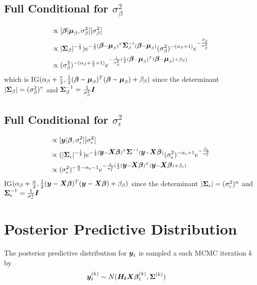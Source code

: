 \documentclass[fleqn]{article}
\def\bm#1{\mbox{\boldmath $#1$}}
\begin{document}
\subsection{Full Conditional for $\sigma^2_\beta$}
%
\begin{align*}
[\sigma^2_\beta | \cdot] & \propto [\bm{\beta} | \bm{\mu}_\beta, \sigma^2_\beta] [\sigma^2_\beta]\\
%
& \propto |\bm{\Sigma}_\beta|^{ - \frac{1} {2}}) e^{ - \frac{1} {2} (\bm{\beta} - \bm{\mu}_\beta)^T \bm{\Sigma}_\beta^{ - 1} (\bm{\beta} - \bm{\mu}_\beta)} (\sigma^2_\beta)^{ - (\alpha_\beta + 1)} e^{ - \frac{\beta_\beta} {\sigma^2_\beta}}\\
%
& \propto (\sigma^2_\beta)^{ - (\alpha_\beta + \frac{\tau} {2} + 1)} e^{ - \frac{1} {\sigma^2_\beta} (\frac{1} {2} (\bm{\beta} - \bm{\mu}_\beta)^T (\bm{\beta} - \bm{\mu}_\beta) + \beta_\beta)}
\end{align*}
%
which is IG$(\alpha_\beta + \frac{\tau} {2}, \frac{1} {2} (\bm{\beta} - \bm{\mu}_\beta)^T (\bm{\beta} - \bm{\mu}_\beta) + \beta_\beta)$ since the determinant $|\bm{\Sigma}_\beta| = (\sigma^2_\beta)^{\tau}$ and $\bm{\Sigma}_\beta^{ - 1} = \frac{1} {\sigma^2_\beta} \bm{I}$
%
\subsection{Full Conditional for $\sigma^2_\epsilon$}
%
\begin{align*}
[\sigma^2_\epsilon | \cdot] & \propto [\bm{y} | \bm{\beta}, \sigma^2_\epsilon] [\sigma^2_\epsilon]\\
%
& \propto (|\bm{\Sigma}_\epsilon |^{ - \frac{1} {2}}) e^{ - \frac{1} {2} (\bm{y} - \bm{X} \bm{\beta})^T \bm{\Sigma}^{ - 1} (\bm{y} - \bm{X} \bm{\beta})} (\sigma^2_\epsilon)^{ - \alpha_\epsilon + 1} e^{ - \frac{\beta_\epsilon} {\sigma^2_\epsilon}}\\
%
& \propto (\sigma^2_\epsilon)^{ -\frac{n} {2} - \alpha_\epsilon - 1} e^{ - \frac{1} {\sigma^2_\epsilon} ( \frac{1} {2} (\bm{y} - \bm{X} \bm{\beta})^T (\bm{y} - \bm{X} \bm{\beta}) + \beta_\epsilon)}
\end{align*}
% 
 IG$(\alpha_\beta + \frac{n} {2}, \frac{1} {2} (\bm{y} - \bm{X} \bm{\beta})^T (\bm{y} - \bm{X} \bm{\beta}) + \beta_\beta)$ since the determinant $|\bm{\Sigma}_\epsilon| = (\sigma^2_\epsilon)^{n}$ and $\bm{\Sigma}_\epsilon^{ - 1} = \frac{1} {\sigma^2_\epsilon} \bm{I}$
%
\section{Posterior Predictive Distribution}
%
The posterior predictive distribution for $\bm{y}_t$ is sampled a each MCMC iteration $k$ by
\begin{align*}
  \bm{y}^{(k)}_t & \sim N(\bm{H_t} \bm{X} \bm{\beta}^{(k)}_t, \bm{\Sigma}^{(k)})
\end{align*}
\end{document}
